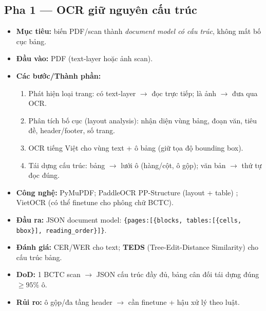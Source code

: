 \documentclass[11pt,a4paper]{article}
\newcommand{\pha}[1]{\subsection{#1}}
\begin{document}
\pha{Pha 1 --- OCR giữ nguyên cấu trúc}
\begin{itemize}
  \item \textbf{Mục tiêu:} biến PDF/scan thành \emph{document model có cấu trúc}, không mất bố cục bảng.
  \item \textbf{Đầu vào:} PDF (text-layer hoặc ảnh scan).
  \item \textbf{Các bước/Thành phần:}
  \begin{enumerate}
    \item Phát hiện loại trang: có text-layer $\rightarrow$ đọc trực tiếp; là ảnh $\rightarrow$ đưa qua OCR.
    \item Phân tích bố cục (layout analysis): nhận diện vùng bảng, đoạn văn, tiêu đề, header/footer, số trang.
    \item OCR tiếng Việt cho vùng text + ô bảng (giữ tọa độ bounding box).
    \item Tái dựng cấu trúc: bảng $\rightarrow$ lưới ô (hàng/cột, ô gộp); văn bản $\rightarrow$ thứ tự đọc đúng.
  \end{enumerate}
  \item \textbf{Công nghệ:} PyMuPDF; PaddleOCR PP-Structure (layout + table) ; VietOCR (có thể finetune cho phông chữ BCTC).
  \item \textbf{Đầu ra:} JSON document model: \texttt{\{pages:[\{blocks, tables:[\{cells, bbox\}], reading\_order\}]\}}.
  \item \textbf{Đánh giá:} CER/WER cho text; \textbf{TEDS} (Tree-Edit-Distance Similarity) cho cấu trúc bảng.
  \item \textbf{DoD:} 1 BCTC scan $\rightarrow$ JSON cấu trúc đầy đủ, bảng cân đối tái dựng đúng $\geq 95\%$ ô.
  \item \textbf{Rủi ro:} ô gộp/đa tầng header $\rightarrow$ cần finetune + hậu xử lý theo luật.
\end{itemize}
\end{document}
